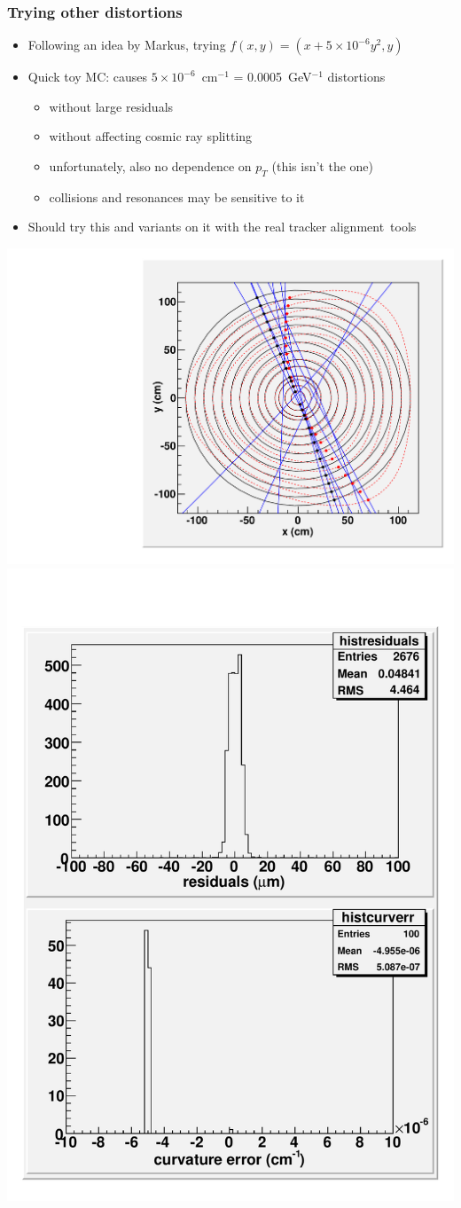\documentclass[compress]{beamer}
\begin{document}
\begin{frame}
\frametitle{Trying other distortions}

\begin{itemize}
\item Following an idea by Markus, trying $f(x, y) = (x + 5\times10^{-6} y^2, y)$
\item Quick toy MC: causes $5\times10^{-6}$~cm$^{-1}$ = 0.0005~GeV$^{-1}$ distortions
\begin{itemize}
\item without large residuals
\item without affecting cosmic ray splitting
\item unfortunately, also no dependence on $p_T$ (this isn't the one)
\item collisions and resonances may be sensitive to it
\end{itemize}
\item Should try this and variants on it with the real tracker \mbox{alignment tools\hspace{-1 cm}}
\end{itemize}

\begin{center}
\begin{minipage}{0.8\linewidth}
\includegraphics[width=0.55\linewidth]{toymc_tracker.pdf}
\includegraphics[width=0.4\linewidth]{toymc_results.pdf}
\end{minipage}
\end{center}
\end{frame}
\end{document}
